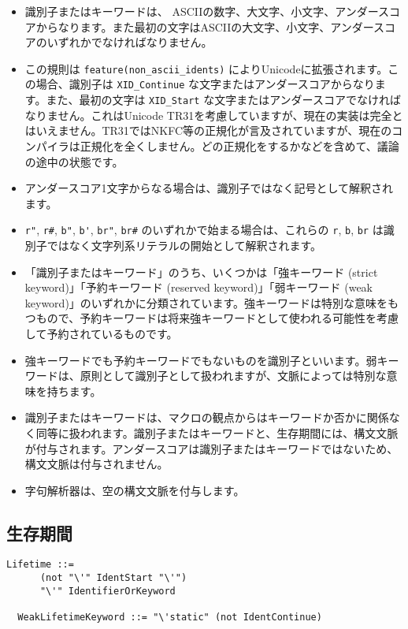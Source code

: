 \documentclass[dvipdfmx,uplatex,papersize,a4paper,10pt]{jsbook}
\theoremstyle{definition}
\begin{document}
\begin{itemize}
  \item 識別子またはキーワードは、 ASCIIの数字、大文字、小文字、アンダースコアからなります。また最初の文字はASCIIの大文字、小文字、アンダースコアのいずれかでなければなりません。
  \item この規則は \verb|feature(non_ascii_idents)| によりUnicodeに拡張されます。この場合、識別子は \verb|XID_Continue| な文字またはアンダースコアからなります。また、最初の文字は \verb|XID_Start| な文字またはアンダースコアでなければなりません。これはUnicode TR31を考慮していますが、現在の実装は完全とはいえません。TR31ではNKFC等の正規化が言及されていますが、現在のコンパイラは正規化を全くしません。どの正規化をするかなどを含めて、議論の途中の状態です。
  \item アンダースコア1文字からなる場合は、識別子ではなく記号として解釈されます。
  \item \verb|r"|, \verb|r#|, \verb|b"|, \verb|b'|, \verb|br"|, \verb|br#| のいずれかで始まる場合は、これらの \verb|r|, \verb|b|, \verb|br| は識別子ではなく文字列系リテラルの開始として解釈されます。
  \item 「識別子またはキーワード」のうち、いくつかは「強キーワード (strict keyword)」「予約キーワード (reserved keyword)」「弱キーワード (weak keyword)」のいずれかに分類されています。強キーワードは特別な意味をもつもので、予約キーワードは将来強キーワードとして使われる可能性を考慮して予約されているものです。
  \item 強キーワードでも予約キーワードでもないものを識別子といいます。弱キーワードは、原則として識別子として扱われますが、文脈によっては特別な意味を持ちます。
  \item 識別子またはキーワードは、マクロの観点からはキーワードか否かに関係なく同等に扱われます。識別子またはキーワードと、生存期間には、構文文脈が付与されます。アンダースコアは識別子またはキーワードではないため、構文文脈は付与されません。
  \item 字句解析器は、空の構文文脈を付与します。
\end{itemize}

\subsection{生存期間}

\begin{lstlisting}[gobble=2]
  Lifetime ::=
      (not "\'" IdentStart "\'")
      "\'" IdentifierOrKeyword

  WeakLifetimeKeyword ::= "\'static" (not IdentContinue)
\end{lstlisting}
\end{document}

